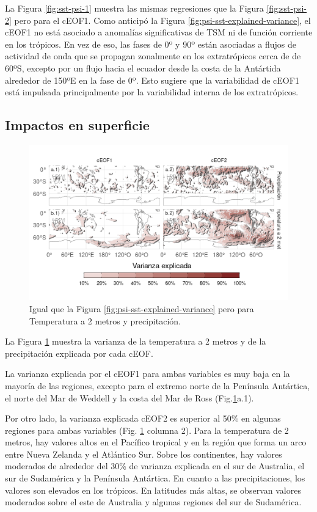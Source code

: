 \documentclass[12pt,oneside]{reedthesis}
\begin{document}
La Figura \ref{fig:sst-psi-1} muestra las mismas regresiones que la Figura \ref{fig:sst-psi-2} pero para el cEOF1.
Como anticipó la Figura \ref{fig:psi-sst-explained-variance}, el cEOF1 no está asociado a anomalías significativas de TSM ni de función corriente en los trópicos.
En vez de eso, las fases de 0º y 90º están asociadas a flujos de actividad de onda que se propagan zonalmente en los extratrópicos cerca de de 60ºS, excepto por un flujo hacia el ecuador desde la costa de la Antártida alrededor de 150ºE en la fase de 0º.
Esto sugiere que la variabilidad de cEOF1 está impulsada principalmente por la variabilidad interna de los extratrópicos.

\hypertarget{impactos}{%
\subsection{Impactos en superficie}\label{impactos}}

\begin{figure}
\includegraphics{figures/20-ceofs/pp-t2m-r2-1} \caption{Igual que la Figura \ref{fig:psi-sst-explained-variance} pero para Temperatura a 2 metros y precipitación.}\label{fig:pp-t2m-r2}
\end{figure}



La Figura \ref{fig:pp-t2m-r2} muestra la varianza de la temperatura a 2 metros y de la precipitación explicada por cada cEOF.

La varianza explicada por el cEOF1 para ambas variables es muy baja en la mayoría de las regiones, excepto para el extremo norte de la Península Antártica, el norte del Mar de Weddell y la costa del Mar de Ross (Fig.\ref{fig:pp-t2m-r2}a.1).

Por otro lado, la varianza explicada cEOF2 es superior al 50\% en algunas regiones para ambas variables (Fig. \ref{fig:pp-t2m-r2} columna 2).
Para la temperatura de 2 metros, hay valores altos en el Pacífico tropical y en la región que forma un arco entre Nueva Zelanda y el Atlántico Sur.
Sobre los continentes, hay valores moderados de alrededor del 30\% de varianza explicada en el sur de Australia, el sur de Sudamérica y la Península Antártica.
En cuanto a las precipitaciones, los valores son elevados en los trópicos.
En latitudes más altas, se observan valores moderados sobre el este de Australia y algunas regiones del sur de Sudamérica.
\end{document}
